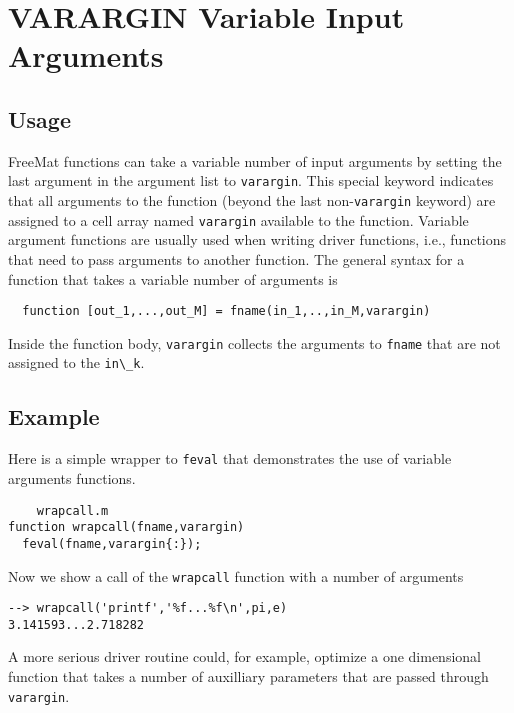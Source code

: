 \section{VARARGIN Variable Input Arguments}

\subsection{Usage}

FreeMat functions can take a variable number of input arguments
by setting the last argument in the argument list to \verb|varargin|.
This special keyword indicates that all arguments to the
function (beyond the last non-\verb|varargin| keyword) are assigned
to a cell array named \verb|varargin| available to the function.
Variable argument functions are usually used when writing
driver functions, i.e., functions that need to pass arguments
to another function.  The general syntax for a function that
takes a variable number of arguments is
\begin{verbatim}
  function [out_1,...,out_M] = fname(in_1,..,in_M,varargin)
\end{verbatim}
Inside the function body, \verb|varargin| collects the arguments
to \verb|fname| that are not assigned to the \verb|in\_k|.
\subsection{Example}

Here is a simple wrapper to \verb|feval| that demonstrates the
use of variable arguments functions.
\begin{verbatim}
    wrapcall.m
function wrapcall(fname,varargin)
  feval(fname,varargin{:});
\end{verbatim}
Now we show a call of the \verb|wrapcall| function with a number
of arguments
\begin{verbatim}
--> wrapcall('printf','%f...%f\n',pi,e)
3.141593...2.718282
\end{verbatim}
A more serious driver routine could, for example, optimize
a one dimensional function that takes a number of auxilliary
parameters that are passed through \verb|varargin|.
